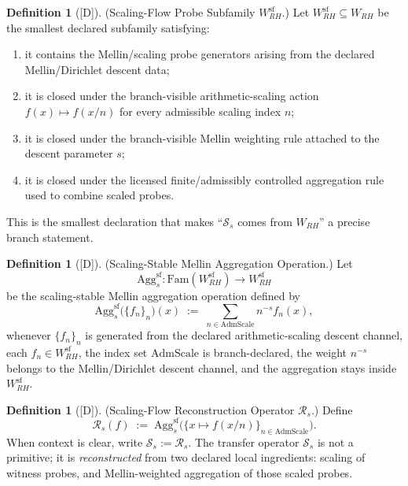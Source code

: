 \documentclass[12pt,oneside]{amsbook}
\theoremstyle{plain}
\theoremstyle{definition}
\newtheorem{definition}[theorem]{Definition}
\theoremstyle{remark}
\newcommand{\status}[1]{\textup{[#1]}}
\begin{document}
\begin{definition}[\status{D}]\label{def:rh-sf-probe-subfamily}
\textup{(Scaling-Flow Probe Subfamily $W_{RH}^{\mathrm{sf}}$.)}
Let $W_{RH}^{\mathrm{sf}} \subseteq W_{RH}$ be the smallest declared
subfamily satisfying:
\begin{enumerate}[label=\textup{(\arabic*)}]
 \item it contains the Mellin/scaling probe generators arising from
 the declared Mellin/Dirichlet descent data;
 \item it is closed under the branch-visible arithmetic-scaling
 action $f(x) \mapsto f(x/n)$ for every admissible scaling
 index $n$;
 \item it is closed under the branch-visible Mellin weighting rule
 attached to the descent parameter $s$;
 \item it is closed under the licensed finite/admissibly controlled
 aggregation rule used to combine scaled probes.
\end{enumerate}
This is the smallest declaration that makes ``$\mathcal{S}_s$ comes
from $W_{RH}$'' a precise branch statement.
\end{definition}

\begin{definition}[\status{D}]\label{def:rh-sf-aggregation-channel}
\textup{(Scaling-Stable Mellin Aggregation Operation.)}
Let
\[
 \mathrm{Agg}^{\mathrm{sf}}_s : \mathrm{Fam}(W_{RH}^{\mathrm{sf}})
 \to W_{RH}^{\mathrm{sf}}
\]
be the scaling-stable Mellin aggregation operation defined by
\[
 \mathrm{Agg}^{\mathrm{sf}}_s\bigl(\{f_n\}_n\bigr)(x)
 \;:=\; \sum_{n \in \mathrm{AdmScale}} n^{-s} f_n(x),
\]
whenever $\{f_n\}_n$ is generated from the declared arithmetic-scaling
descent channel, each $f_n \in W_{RH}^{\mathrm{sf}}$, the index set
$\mathrm{AdmScale}$ is branch-declared, the weight $n^{-s}$ belongs
to the Mellin/Dirichlet descent channel, and the aggregation stays
inside $W_{RH}^{\mathrm{sf}}$.
\end{definition}

\begin{definition}[\status{D}]\label{def:rh-sf-reconstruction-rule}
\textup{(Scaling-Flow Reconstruction Operator $\mathcal{R}_s$.)}
Define
\[
 \mathcal{R}_s(f)
 \;:=\; \mathrm{Agg}^{\mathrm{sf}}_s
 \bigl(\{x \mapsto f(x/n)\}_{n \in \mathrm{AdmScale}}\bigr).
\]
When context is clear, write $\mathcal{S}_s := \mathcal{R}_s$.
The transfer operator $\mathcal{S}_s$ is not a primitive; it is
\emph{reconstructed} from two declared local ingredients: scaling of
witness probes, and Mellin-weighted aggregation of those scaled probes.
\end{definition}
\end{document}
